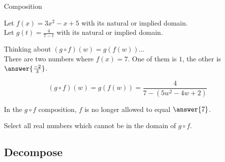 \documentclass{ximera}
\begin{document}
\begin{example} Composition 



Let $f(x) = 3x^2 - x + 5$ with its natural or implied domain. \\
Let $g(t) = \frac{4}{7-t}$ with its natural or implied domain. 



Thinking about $(g \circ f)(w) = g(f(w))$... \\

There are two numbers where $f(x) = 7$.  One of them is $1$, the other is $\answer{\frac{-2}{3}}$.






\[
(g \circ f)(w) = g(f(w)) = \frac{4}{7 - (5w^2 - 4w + 2)}
\]



In the $g \circ f$ composition, $f$ is no longer allowed to equal $\answer{7}$.

Select all real numbers which cannot be in the domain of $g \circ f$.

\begin{selectAll}
\end{selectAll}


\end{example}

























\subsection*{Decompose}
\end{document}
